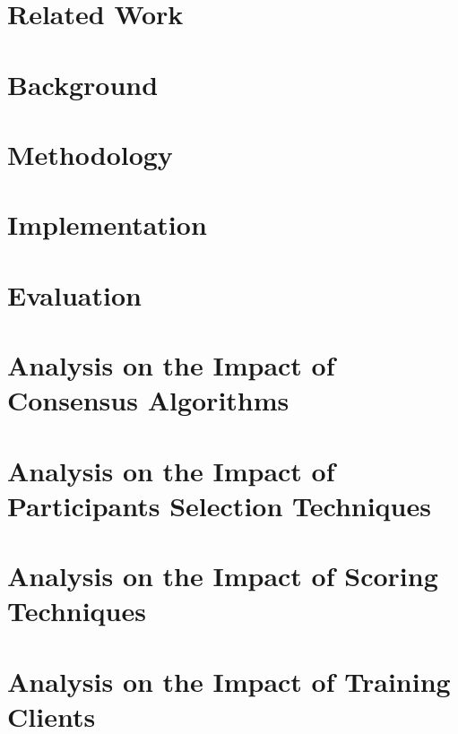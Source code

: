 \documentclass[12pt,a4paper,oneside]{book}
\begin{document}
\chapter{Related Work}\label{chapter:related_work}


\chapter{Background}\label{chapter:background}


\chapter{Methodology}\label{chapter:methodology}


\chapter{Implementation}\label{chapter:implementation}


\chapter{Evaluation}\label{chapter:evaluation}


\chapter{Analysis on the Impact of Consensus Algorithms}\label{chapter:analysis:consensus_algorithms}


\chapter{Analysis on the Impact of Participants Selection Techniques}\label{chapter:analysis:participants}


\chapter{Analysis on the Impact of Scoring Techniques}\label{chapter:analysis:scoring}


\chapter{Analysis on the Impact of Training Clients}\label{chapter:analysis:clients}
\end{document}
